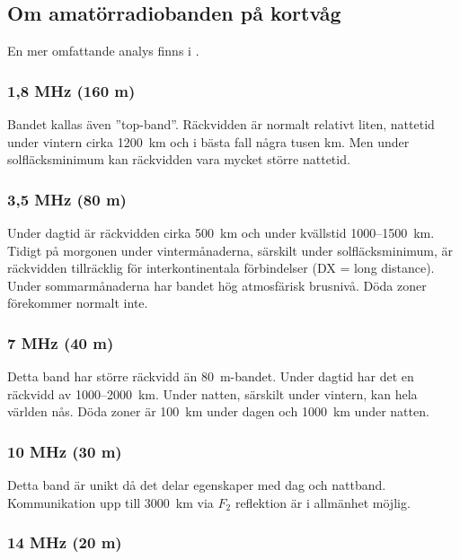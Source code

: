 \subsection{Om amatörradiobanden på kortvåg}

En mer omfattande analys finns i \cite{ARRLHDB2015}.

\subsubsection{1,8 MHz (160 m)}

Bandet kallas även ''top-band''.
Räckvidden är normalt relativt liten, nattetid under vintern cirka 1200~km och i
bästa fall några tusen km.
Men under solfläcksminimum kan räckvidden vara mycket större nattetid.

\subsubsection{3,5 MHz (80 m)}

Under dagtid är räckvidden cirka 500~km och under kvällstid 1000--1500~km.
Tidigt på morgonen under vintermånaderna, särskilt under solfläcksminimum, är
räckvidden tillräcklig för interkontinentala förbindelser (DX = long distance).
Under sommarmånaderna har bandet hög atmosfärisk brusnivå.
Döda zoner förekommer normalt inte.

\subsubsection{7 MHz (40 m)}

Detta band har större räckvidd än 80~m-bandet.
Under dagtid har det en räckvidd av 1000--2000~km.
Under natten, särskilt under vintern, kan hela världen nås.
Döda zoner är 100~km under dagen och 1000~km under natten.

\subsubsection{10 MHz (30 m)}

Detta band är unikt då det delar egenskaper med dag och nattband.
Kommunikation upp till 3000~km via \(F_2\) reflektion är i allmänhet möjlig.

\subsubsection{14 MHz (20 m)}


